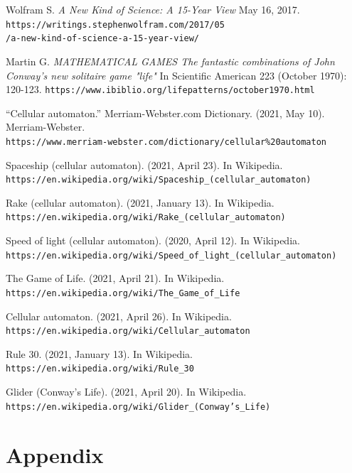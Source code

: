 \documentclass[12pt]{article}
\numberwithin{figure}{section} %
\begin{document}
\begin{thebibliography}{9}
Wolfram S. 
\textit{A New Kind of Science: A 15-Year View}
May 16, 2017.
\\\texttt{https://writings.stephenwolfram.com/2017/05}
\\\texttt{/a-new-kind-of-science-a-15-year-view/}
 
Martin G.
\textit{MATHEMATICAL GAMES The fantastic combinations of John Conway's new solitaire game "life"}
In Scientific American 223 (October 1970): 120-123.
\texttt{https://www.ibiblio.org/lifepatterns/october1970.html}

“Cellular automaton.” Merriam-Webster.com Dictionary. (2021, May 10). Merriam-Webster. 
\\\texttt{https://www.merriam-webster.com/dictionary/cellular\%20automaton}

Spaceship (cellular automaton). (2021, April 23). In Wikipedia.
\\\texttt{https://en.wikipedia.org/wiki/Spaceship\_(cellular\_automaton)}

Rake (cellular automaton). (2021, January 13). In Wikipedia.
\\\texttt{https://en.wikipedia.org/wiki/Rake\_(cellular\_automaton)}

Speed of light (cellular automaton). (2020, April 12). In Wikipedia.
\\\texttt{https://en.wikipedia.org/wiki/Speed\_of\_light\_(cellular\_automaton)}

The Game of Life. (2021, April 21). In Wikipedia. 
\\\texttt{https://en.wikipedia.org/wiki/The\_Game\_of\_Life}

Cellular automaton. (2021, April 26). In Wikipedia. 
\\\texttt{https://en.wikipedia.org/wiki/Cellular\_automaton}

Rule 30. (2021, January 13). In Wikipedia. 
\\\texttt{https://en.wikipedia.org/wiki/Rule\_30}

Glider (Conway’s Life). (2021, April 20). In Wikipedia. 
\\\texttt{https://en.wikipedia.org/wiki/Glider\_(Conway’s\_Life)}

\end{thebibliography}

\newpage
\section{Appendix}
\end{document}
